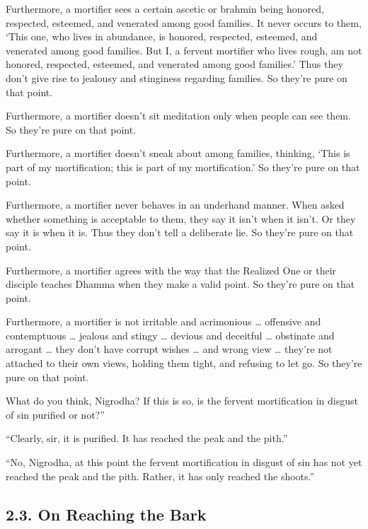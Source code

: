 \documentclass[12pt,openany]{book}%
\begin{document}
Furthermore, a mortifier sees a certain ascetic or brahmin being honored, respected, esteemed, and venerated among good families. It never occurs to them, ‘This one, who lives in abundance, is honored, respected, esteemed, and venerated among good families. But I, a fervent mortifier who lives rough, am not honored, respected, esteemed, and venerated among good families.’ Thus they don’t give rise to jealousy and stinginess regarding families. So they’re pure on that point. 

Furthermore, a mortifier doesn’t sit meditation only when people can see them. So they’re pure on that point. 

Furthermore, a mortifier doesn’t sneak about among families, thinking, ‘This is part of my mortification; this is part of my mortification.’ So they’re pure on that point. 

Furthermore, a mortifier never behaves in an underhand manner. When asked whether something is acceptable to them, they say it isn’t when it isn’t. Or they say it is when it is. Thus they don’t tell a deliberate lie. So they’re pure on that point. 

Furthermore, a mortifier agrees with the way that the Realized One or their disciple teaches Dhamma when they make a valid point. So they’re pure on that point. 

Furthermore, a mortifier is not irritable and acrimonious … offensive and contemptuous … jealous and stingy … devious and deceitful … obstinate and arrogant … they don’t have corrupt wishes … and wrong view … they’re not attached to their own views, holding them tight, and refusing to let go. So they’re pure on that point. 

What do you think, Nigrodha? If this is so, is the fervent mortification in disgust of sin purified or not?” 

“Clearly, sir, it is purified. It has reached the peak and the pith.” 

“No, Nigrodha, at this point the fervent mortification in disgust of sin has not yet reached the peak and the pith. Rather, it has only reached the shoots.” 

\subsection*{2.3. On Reaching the Bark }
\end{document}
